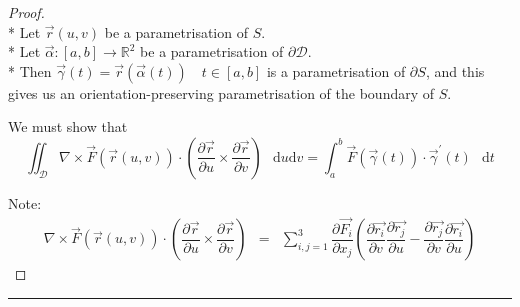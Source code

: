 \documentclass[10pt,a4paper]{report}
\theoremstyle{definition}
\theoremstyle{plain}
\theoremstyle{definition}
\theoremstyle{plain}
\newcommand{\dd}{\mathop{}\,\mathrm{d}}
\newcommand{\ddns}{\mathrm{d}}
\newcommand{\parderiv}[2]{\dfrac{\partial #1}{\partial #2}}
\newenvironment{proofenv}{\begin{proof}}{\end{proof}{\par\centering\rule{3cm}{.1pt}\par}}
\newcommand{\real}{\mathbb{R}}
\newcommand{\domain}{\mathcal{D}}
\newcommand{\curl}[1]{\nabla\!\times\!#1}
\newcommand{\crossnormal}[3]{\left(\parderiv{\vec{#1}}{#2} \times \parderiv{\vec{#1}}{#3} \right)}
\begin{document}
\begin{proofenv} \\*
    Let $\vec{r}(u,v)$ be a parametrisation of $S$.\\*
    Let $\vec{\alpha}\colon [a,b] \to \real^2$ be a parametrisation of $\partial\domain$.\\*
    Then $\vec{\gamma}(t) = \vec{r}(\vec{\alpha}(t))\quad t\in[a,b]$ is a parametrisation of $\partial S$, and this gives us
    an orientation-preserving parametrisation of the boundary of $S$.
    
    We must show that
    \[
        \iint_\domain\curl{\vec{F}}(\vec{r}(u,v)) \cdot \crossnormal{r}{u}{v} \dd u\ddns v
        =
        \int_a^b\vec{F}(\vec{\gamma}(t)) \cdot \vec{\gamma}^\prime(t) \dd t
    \]
    
    Note:
    \begin{eqnarray}
        \curl{\vec{F}}(\vec{r}(u,v)) \cdot \crossnormal{r}{u}{v}
        &=&
        \sum_{i,j=1}^3 \parderiv{\vec{F_i}}{x_j} \left(
            \parderiv{\vec{r_i}}{v}\parderiv{\vec{r_j}}{u} - \parderiv{\vec{r_j}}{v}\parderiv{\vec{r_i}}{u}
            \right) \label{thm:1-2-1}
    \end{eqnarray}
    

\end{proofenv}
\end{document}
